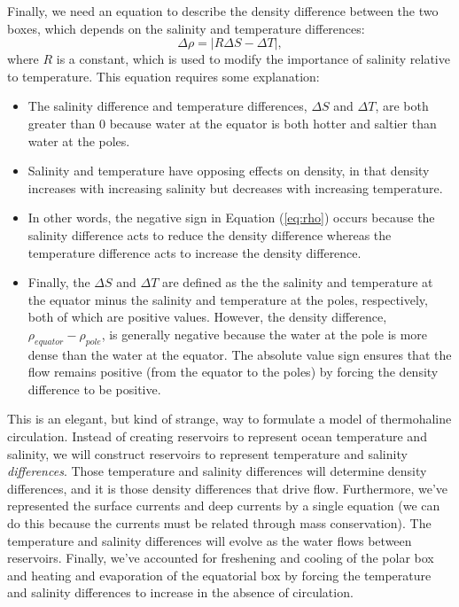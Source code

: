 \documentclass[11pt,letterpaper]{article}
\begin{document}
Finally, we need an equation to describe the density difference between the two boxes, which depends on the salinity and temperature differences:
\begin{equation}
\Delta{\rho}=|R\Delta{S}-\Delta{T}|,
\label{eq:rho}
\end{equation}
where $R$ is a constant, which is used to modify the importance of salinity relative to temperature. This equation requires some explanation:
\begin{itemize}
\item The salinity difference and temperature differences, $\Delta S$ and $\Delta T$, are both greater than 0 because water at the equator is both hotter and saltier than water at the poles.
\item Salinity and temperature have opposing effects on density, in that density increases with increasing salinity but decreases with increasing temperature.
\item In other words, the negative sign in Equation (\ref{eq:rho}) occurs because the salinity difference acts to reduce the density difference whereas the temperature difference acts to increase the density difference.
\item Finally, the $\Delta S$ and $\Delta T$ are defined as the the salinity and temperature at the equator minus the salinity and temperature at the poles, respectively, both of which are positive values. However, the density difference, $\rho_{equator}-\rho_{pole}$, is generally negative because the water at the pole is more dense than the water at the equator. The absolute value sign ensures that the flow remains positive (from the equator to the poles) by forcing the density difference to be positive.
\end{itemize}


This is an elegant, but kind of strange, way to formulate a model of thermohaline circulation. Instead of creating reservoirs to represent ocean temperature and salinity, we will construct reservoirs to represent temperature and salinity \textit{differences}. Those temperature and salinity differences will determine density differences, and it is those density differences that drive flow. Furthermore, we've represented the surface currents and deep currents by a single equation (we can do this because the currents must be related through mass conservation). The temperature and salinity differences will evolve as the water flows between reservoirs. Finally, we've accounted for freshening and cooling of the polar box and heating and evaporation of the equatorial box by forcing the temperature and salinity differences to increase in the absence of circulation. 
\end{document}

